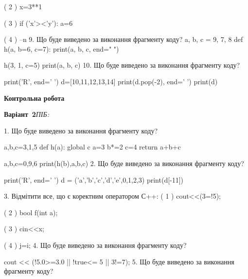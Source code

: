 \documentclass[11pt]{article}
\begin{document}
( 2 ) x=3**1

( 3 ) if ('x'><'y'): a=6

( 4 ) --n
\vspace{5mm}
9. Що буде виведено за виконання фрагменту коду?
a, b, c = 9, 7, 8
def h(a, b=6, c=7):
    print(a, b, c, end=" ")

h(3, 1, c=5)
print(a, b, c)
\vspace{5mm}
10. Що буде виведено за виконання фрагменту коду?

print('R', end=' ')
d=[10,11,12,13,14]
print(d.pop(-2), end=' ')
print(d)

\vspace{5mm}










\newpage

\newpage

{\large\textbf{Контрольна робота}}

\textbf{Варіант \No\,2}\hfill \textit{ПІБ:}\,\underline{\hspace{60mm}}
\vspace{4mm}

1. Що буде виведено за виконання фрагменту коду?

a,b,c=3,1,5
def h(a):
global c    a=3
    b*=2
    c=4
    return a+b+c

a,b,c=0,9,6
print(h(b),a,b,c)
\vspace{5mm}
2. Що буде виведено за виконання фрагменту коду?

print('R', end=' ')
d = ('a','b','c','d','e',0,1,2,3)
print(d[-11])

\vspace{5mm}
3. %
Відмітити все, що є коректним оператором С++:
( 1 ) cout<<(3=!5);

( 2 ) bool f(int a);

( 3 ) cin<<x;

( 4 ) j=i;
\vspace{5mm}
4. Що буде виведено за виконання фрагменту коду?

cout << (!5.0>=3.0 || !true<= 5 || 3!=7);
\vspace{5mm}
5. Що буде виведено за виконання фрагменту коду?
\end{document}
